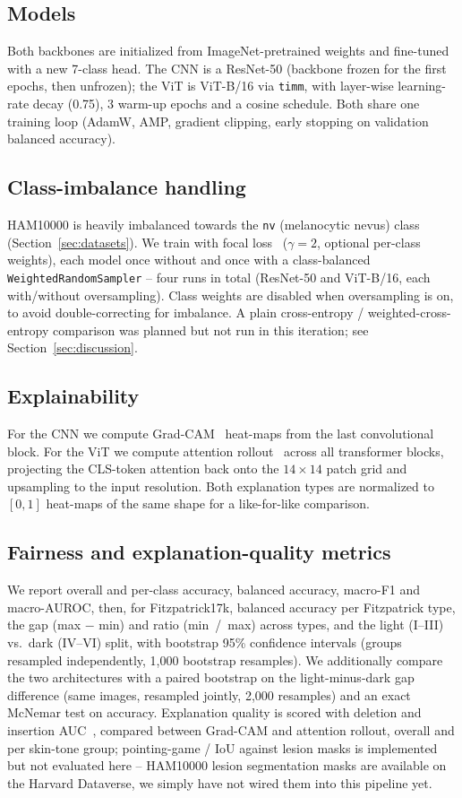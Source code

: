 \documentclass[twoside,a4paper,11pt]{article}
\begin{document}
\subsection{Models}
Both backbones are initialized from ImageNet-pretrained weights and
fine-tuned with a new 7-class head. The CNN is a ResNet-50 (backbone
frozen for the first epochs, then unfrozen); the ViT is ViT-B/16 via
\texttt{timm}, with layer-wise learning-rate decay (0.75), 3 warm-up
epochs and a cosine schedule. Both share one training loop (AdamW, AMP,
gradient clipping, early stopping on validation balanced accuracy).

\subsection{Class-imbalance handling}
HAM10000 is heavily imbalanced towards the \texttt{nv} (melanocytic
nevus) class (Section~\ref{sec:datasets}). We train with focal
loss~\cite{Lin:17} ($\gamma=2$, optional per-class weights), each model
once without and once with a class-balanced
\texttt{WeightedRandomSampler} -- four runs in total (ResNet-50 and
ViT-B/16, each with/without oversampling). Class weights are disabled
when oversampling is on, to avoid double-correcting for imbalance. A
plain cross-entropy / weighted-cross-entropy comparison was planned but
not run in this iteration; see Section~\ref{sec:discussion}.

\subsection{Explainability}
For the CNN we compute Grad-CAM~\cite{Selvaraju:17} heat-maps from the
last convolutional block. For the ViT we compute attention
rollout~\cite{Abnar:20} across all transformer blocks, projecting the
CLS-token attention back onto the $14\times14$ patch grid and
upsampling to the input resolution. Both explanation types are
normalized to $[0,1]$ heat-maps of the same shape for a like-for-like
comparison.

\subsection{Fairness and explanation-quality metrics}
We report overall and per-class accuracy, balanced accuracy, macro-F1
and macro-AUROC, then, for Fitzpatrick17k, balanced accuracy per
Fitzpatrick type, the gap (max $-$ min) and ratio (min~/~max) across
types, and the light (I--III) vs.\ dark (IV--VI) split, with bootstrap
95\% confidence intervals (groups resampled independently, 1{,}000
bootstrap resamples). We additionally compare the two architectures
with a paired bootstrap on the light-minus-dark gap difference (same
images, resampled jointly, 2{,}000 resamples) and an exact McNemar test
on accuracy. Explanation
quality is scored with deletion and insertion AUC~\cite{Petsiuk:18},
compared between Grad-CAM and attention rollout, overall and per
skin-tone group; pointing-game / IoU against lesion masks is
implemented but not evaluated here -- HAM10000 lesion segmentation
masks are available on the Harvard Dataverse, we simply have not wired
them into this pipeline yet.
\end{document}
